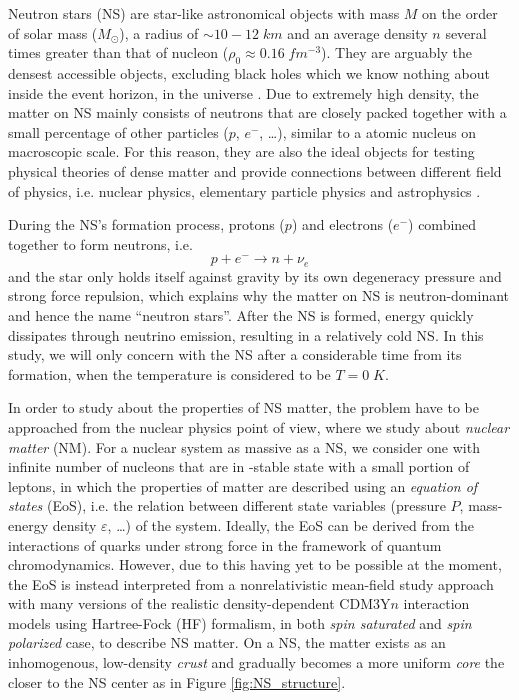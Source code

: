 
Neutron stars (\gls{NS}) are star-like astronomical objects with mass $M$ on the order of solar mass ($M_\odot$), a radius of $\sim 10-12\;km$ and an average density $n$ several times greater than that of nucleon ($\rho_0 \approx 0.16\;fm^{-3}$). They are arguably the densest accessible objects, excluding black holes which we know nothing about inside the event horizon, in the universe \cite{baym1975neutron}. Due to extremely high density, the matter on \gls{NS} mainly consists of neutrons that are closely packed together with a small percentage of other particles ($p$, $e^-$, \ldots), similar to a atomic nucleus on macroscopic scale. For this reason, they are also the ideal objects for testing physical theories of dense matter and provide connections between different field of physics, i.e. nuclear physics, elementary particle physics and astrophysics \cite{lattimer2004physics}.\par
During the \gls{NS}'s formation process, protons ($p$) and electrons ($e^-$) combined together to form neutrons, i.e.
\begin{equation}
        p + e^- \longrightarrow n + \nu_e
\end{equation}
and the star only holds itself against gravity by its own degeneracy pressure and strong force repulsion, which explains why the matter on \gls{NS} is neutron-dominant and hence the name ``neutron stars''. After the \gls{NS} is formed, energy quickly dissipates through neutrino emission, resulting in a relatively cold \gls{NS}. In this study, we will only concern with the \gls{NS} after a considerable time from its formation, when the temperature is considered to be $T=0\;K$.\par
In order to study about the properties of \gls{NS} matter, the problem have to be approached from the nuclear physics point of view, where we study about \emph{nuclear matter} (\gls{NM}). For a nuclear system as massive as a \gls{NS}, we consider one with infinite number of nucleons that are in \textbeta-stable state with a small portion of leptons, in which the properties of matter are described using an \emph{equation of states} (\gls{EoS}), i.e. the relation between different state variables (pressure $P$, mass-energy density $\varepsilon$, \ldots) of the system. Ideally, the \gls{EoS} can be derived from the interactions of quarks under strong force in the framework of quantum chromodynamics. However, due to this having yet to be possible at the moment, the \gls{EoS} is instead interpreted from a nonrelativistic mean-field study approach with many versions of the realistic density-dependent CDM3Y$n$ interaction models \cite{khoa1995equation,khoa2007mean} using Hartree-Fock (\gls{HF}) formalism, in both \emph{spin saturated} and \emph{spin polarized} case, to describe \gls{NS} matter. On a \gls{NS}, the matter exists as an inhomogenous, low-density \emph{crust} and gradually becomes a more uniform \emph{core} the closer to the \gls{NS} center as in Figure \ref{fig:NS_structure}.

